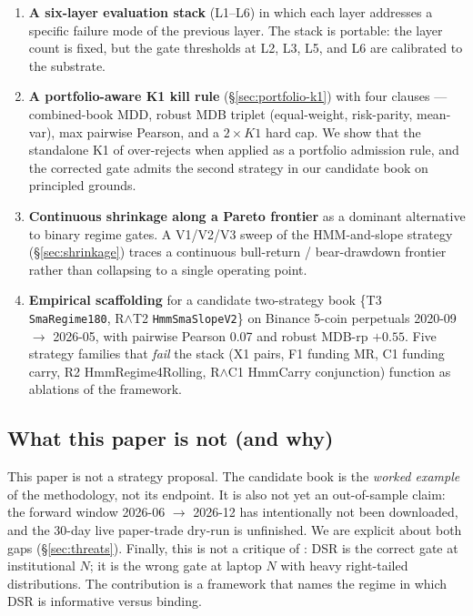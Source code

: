\documentclass[11pt]{article}
\begin{document}
\begin{enumerate}
  \item \textbf{A six-layer evaluation stack} (L1--L6) in which each layer
        addresses a specific failure mode of the previous layer. The stack is
        portable: the layer count is fixed, but the gate thresholds at L2,
        L3, L5, and L6 are calibrated to the substrate.
  \item \textbf{A portfolio-aware K1 kill rule} (\S\ref{sec:portfolio-k1})
        with four clauses --- combined-book MDD, robust MDB triplet
        (equal-weight, risk-parity, mean-var), max pairwise Pearson, and a
        $2\times K1$ hard cap. We show that the standalone K1 of
        \citet{decision_004} over-rejects when applied as a portfolio
        admission rule, and the corrected gate admits the second strategy in
        our candidate book on principled grounds.
  \item \textbf{Continuous shrinkage along a Pareto frontier} as a dominant
        alternative to binary regime gates. A V1/V2/V3 sweep of the
        HMM-and-slope strategy (\S\ref{sec:shrinkage}) traces a continuous
        bull-return / bear-drawdown frontier rather than collapsing to a
        single operating point.
  \item \textbf{Empirical scaffolding} for a candidate two-strategy book
        \{T3 \texttt{SmaRegime180}, R$\wedge$T2 \texttt{HmmSmaSlopeV2}\}
        on Binance 5-coin perpetuals 2020-09 $\to$ 2026-05, with pairwise
        Pearson 0.07 and robust MDB-rp $+0.55$. Five strategy families that
        \emph{fail} the stack (X1 pairs, F1 funding MR, C1 funding carry, R2
        HmmRegime4Rolling, R$\wedge$C1 HmmCarry conjunction) function as
        ablations of the framework.
\end{enumerate}

\subsection{What this paper is not (and why)}

This paper is not a strategy proposal. The candidate book is the
\emph{worked example} of the methodology, not its endpoint. It is also not
yet an out-of-sample claim: the forward window 2026-06 $\to$ 2026-12 has
intentionally not been downloaded, and the 30-day live paper-trade dry-run is
unfinished. We are explicit about both gaps (\S\ref{sec:threats}). Finally,
this is not a critique of \citet{lopezdeprado2014dsr}: DSR is the correct
gate at institutional $N$; it is the wrong gate at laptop $N$ with heavy
right-tailed distributions. The contribution is a framework that names the
regime in which DSR is informative versus binding.
\end{document}
